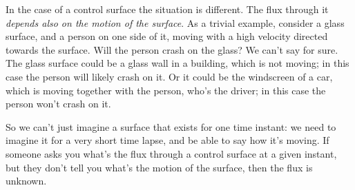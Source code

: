 \documentclass[a4paper,12pt,%
onecolumn,oneside,titlepage,%
british%
]{memoir}
\renewcommand*{\|}[1][]{\nonscript\:#1\vert\nonscript\:\mathopen{}}
\begin{document}
%
In the case of a control surface the situation is different. The flux through it \emph{depends also on the motion of the surface}. As a trivial example, consider a glass surface, and a person on one side of it, moving with a high velocity directed towards the surface. Will the person crash on the glass? We can't say for sure. The glass surface could be a glass wall in a building, which is not moving; in this case the person will likely crash on it. Or it could be the windscreen of a car, which is moving together with the person, who's the driver; in this case the person won't crash on it.

So we can't just imagine a surface that exists for one time instant: we need to imagine it for a very short time lapse, and be able to say how it's moving. If someone asks you what's the flux through a control surface at a given instant, but they don't tell you what's the motion of the surface, then the flux is unknown.
\end{document}
